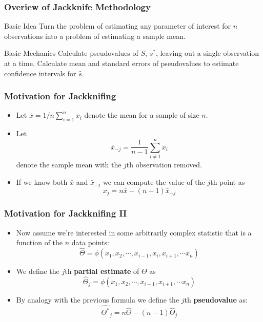 \documentclass{beamer}
\begin{document}
\begin{frame}
  \frametitle{Overiew of Jackknife Methodology}

\begin{block}{Basic Idea}
Turn the problem of estimating any parameter of interest for $n$ observations into a problem of estimating a sample mean.
\end{block}

\begin{block}{Basic Mechanics}
Calculate pseudovalues of $S$, $s^*$, leaving out a single observation at a time. Calculate mean and standard errors of pseudovalues to estimate confidence intervals for $\widehat{s}$.

\end{block}




\end{frame}

\begin{frame}
  \frametitle{Motivation for Jackknifing}

\begin{itemize}
    \item Let $\bar{x} = 1/n \sum_{i=1}^{n}x_i$ denote the mean for a sample of size $n$.

    \item Let
\[
\bar{x}_{-j} = \frac{1}{n-1} \sum_{i \neq 1}^{n}x_i
\]
denote the sample mean with the $j$th observation removed.

    \item If we know both $\bar{x}$ and $\bar{x}_{-j}$ we can compute the value of the $j$th point as
\[
x_j = n\bar{x} - (n-1)\bar{x}_{-j}
\]


\end{itemize}

\end{frame}



\begin{frame}
  \frametitle{Motivation for Jackknifing II}

\begin{itemize}
    \item Now assume we're interested in some arbitrarily complex statistic that is a function of the $n$ data points:
\[
\widehat{\Theta} = \phi(x_1, x_2, \cdots, x_{i-1}, x_i, x_{i+1}, \cdots x_n)
\]

    \item We define the $j$th \textbf{partial estimate} of $\Theta$ as
\[
\widehat{\Theta}_j = \phi(x_1, x_2, \cdots, x_{i-1}, x_{i+1}, \cdots x_n)
\]

    \item By analogy with the previous formula we define the $j$th \textbf{pseudovalue} as:
\[
\widehat{\Theta^*}_j = n \widehat{\Theta} - (n-1)\widehat{\Theta}_j
\]



\end{itemize}

\end{frame}
\end{document}
